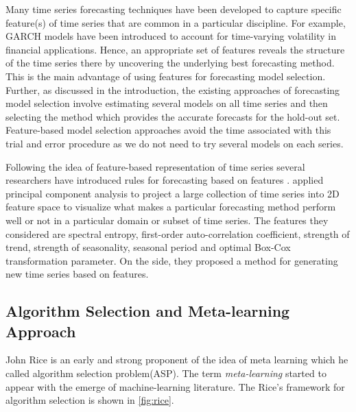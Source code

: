 \documentclass[11pt,a4paper,]{article}
\theoremstyle{definition}
\theoremstyle{definition}
\theoremstyle{definition}
\theoremstyle{remark}
\begin{document}
Many time series forecasting techniques have been developed to capture
specific feature(s) of time series that are common in a particular
discipline. For example, GARCH models have been introduced to account
for time-varying volatility in financial applications. Hence, an
appropriate set of features reveals the structure of the time series
there by uncovering the underlying best forecasting method. This is the
main advantage of using features for forecasting model selection.
Further, as discussed in the introduction, the existing approaches of
forecasting model selection involve estimating several models on all
time series and then selecting the method which provides the accurate
forecasts for the hold-out set. Feature-based model selection approaches
avoid the time associated with this trial and error procedure as we do
not need to try several models on each series.

Following the idea of feature-based representation of time series
several researchers have introduced rules for forecasting based on
features \autocites{collopy1992rule}{adya2001automatic}{wang2009rule}.
\textcite{kang2017visualising} applied principal component analysis to
project a large collection of time series into 2D feature space to
visualize what makes a particular forecasting method perform well or not
in a particular domain or subset of time series. The features they
considered are spectral entropy, first-order auto-correlation
coefficient, strength of trend, strength of seasonality, seasonal period
and optimal Box-Cox transformation parameter. On the side, they proposed
a method for generating new time series based on features.

\subsection{Algorithm Selection and Meta-learning
Approach}\label{algorithm-selection-and-meta-learning-approach}

John Rice is an early and strong proponent of the idea of meta learning
which he called algorithm selection problem(ASP)\autocite{rice1976}. The
term \emph{meta-learning} started to appear with the emerge of
machine-learning literature. The Rice's framework for algorithm
selection is shown in \autoref{fig:rice}.
\end{document}
